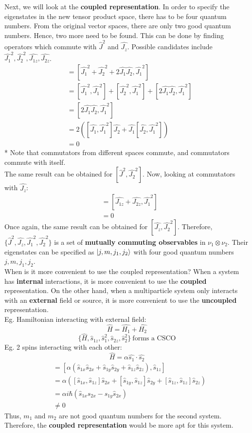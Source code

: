 \documentclass{article}
\begin{document}
\begin{flushleft}
Next, we will look at the \textbf{coupled representation}. In order to specify the eigenstates in the new tensor product space, there has to be four quantum numbers. From the original vector spaces, there are only two good quantum numbers. Hence, two more need to be found. This can be done by finding operators which commute with $\hat{J}^2$ and $\hat{J_z}$. Possible candidates include $\hat{J_1}^2,\hat{J_2}^2,\hat{J_{1z}},\hat{J_{2z}}$.
\begin{align*}
    [\hat{J}^2,\hat{J_1}^2]&=[\hat{J_1}^2+\hat{J_2}^2+2\hat{J_1}\hat{J_2},\hat{J_1}^2]\\
    &=[\hat{J_1}^2,\hat{J_1}^2]+[\hat{J_2}^2,\hat{J_1}^2]+[2\hat{J_1}\hat{J_2},\hat{J_1}^2]\\
    &=[2\hat{J_1}\hat{J_2},\hat{J_1}^2]\\
    &=2([\hat{J_1},\hat{J_1}^2]\hat{J_2}+\hat{J_1}[\hat{J_2},\hat{J_1}^2])\\
    &=0
\end{align*}
* Note that commutators from different spaces commute, and commutators commute with itself.\\
The same result can be obtained for $[\hat{J}^2,\hat{J_2}^2]$. Now, looking at commutators with $\hat{J_z}$:
\begin{align*}
   [\hat{J_z},\hat{J_1}^2]&=[\hat{J_{1z}}+\hat{J_{2z}},\hat{J_1}^2]\\
   &=0
\end{align*}
Once again, the same result can be obtained for $[\hat{J_z},\hat{J_2}^2]$. Therefore, $\{\hat{J}^2,\hat{J_z},\hat{J_1}^2,\hat{J_2}^2\}$ is a set of \textbf{mutually commuting observables} in $\nu_1\otimes\nu_2$. Their eigenstates can be specified as $\ket{j,m,j_1,j_2}$ with four good quantum numbers $j,m,j_1,j_2$.\\[0.5cm]

When is it more convenient to use the coupled representation? When a system has \textbf{internal} interactions, it is more convenient to use the \textbf{coupled} representation. On the other hand, when a multiparticle system only interacts with an \textbf{external} field or source, it is more convenient to use the \textbf{uncoupled} representation.\\
Eg. Hamiltonian interacting with external field:
$$\hat{H}=\hat{H_1}+\hat{H_2}$$
$$\{\hat{H},\hat{s}_{1z},\hat{s}^2_1,\hat{s}_{2z},\hat{s}^2_2\}\ \text{forms a CSCO} $$
Eg. 2 spins interacting with each other:
$$\hat{H}=\alpha\hat{s_1}\cdot\hat{s_2}$$
\begin{align*}
    [\hat{H},\hat{s}_{1z}]&=[\alpha(\hat{s}_{1x}\hat{s}_{2x}+\hat{s}_{1y}\hat{s}_{2y}+\hat{s}_{1z}\hat{s}_{2z}),\hat{s}_{1z}]\\
    &=\alpha([\hat{s}_{1x},\hat{s}_{1z}]\hat{s}_{2x}+[\hat{s}_{1y},\hat{s}_{1z}]\hat{s}_{2y}+[\hat{s}_{1z},\hat{s}_{1z}]\hat{s}_{2z})\\
    &=\alpha i\hbar(\hat{s}_{1x}\hat{s}_{2x}-\hat{s}_{1y}\hat{s}_{2x})\\
    &\neq 0
\end{align*}
Thus, $m_1$ and $m_2$ are not good quantum numbers for the second system. Therefore, the \textbf{coupled representation} would be more apt for this system.\\[0.5cm]


\end{flushleft}
\end{document}
